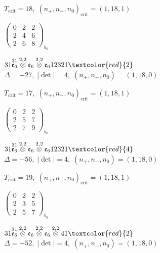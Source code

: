 \documentclass[10pt]{article}
\begin{document}
\hspace{1em}$T_{\text{crit}}=18,\; (n_+,n_-,n_0)_{\text{crit}}=(1,18,1)$

\hspace{2em}$\left(\begin{smallmatrix}0 & 2 & 2 \\ 2 & 4 & 6 \\ 2 & 6 & 8\end{smallmatrix}\right)_{\!b_0}$

\smallskip

$31\overset{31}{\mathfrak{e}_6}\overset{2,2}{\otimes}\mathfrak{e}_6\overset{2,2}{\otimes}\mathfrak{e}_612321\textcolor{red}{2}$ \quad $\Delta=-27,\; |\det|=4,\; (n_+,n_-,n_0)=(1,18,0)$

\hspace{1em}$T_{\text{crit}}=17,\; (n_+,n_-,n_0)_{\text{crit}}=(1,18,1)$

\hspace{2em}$\left(\begin{smallmatrix}0 & 2 & 2 \\ 2 & 5 & 7 \\ 2 & 7 & 9\end{smallmatrix}\right)_{\!b_0}$

$31\overset{31}{\mathfrak{e}_6}\overset{2,2}{\otimes}\mathfrak{e}_6\overset{2,2}{\otimes}\mathfrak{e}_612321\textcolor{red}{4}$ \quad $\Delta=-56,\; |\det|=4,\; (n_+,n_-,n_0)=(1,18,0)$

\hspace{1em}$T_{\text{crit}}=19,\; (n_+,n_-,n_0)_{\text{crit}}=(1,18,1)$

\hspace{2em}$\left(\begin{smallmatrix}0 & 2 & 2 \\ 2 & 3 & 5 \\ 2 & 5 & 7\end{smallmatrix}\right)_{\!b_0}$

\smallskip

$31\overset{31}{\mathfrak{e}_6}\overset{2,2}{\otimes}\mathfrak{e}_6\overset{2,2}{\otimes}\mathfrak{e}_6\overset{2,2}{\otimes}41\textcolor{red}{2}$ \quad $\Delta=-52,\; |\det|=4,\; (n_+,n_-,n_0)=(1,18,0)$
\end{document}
